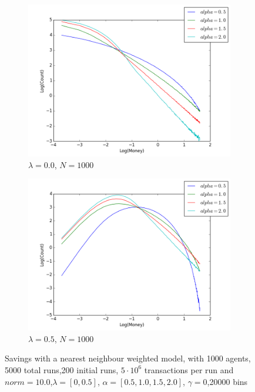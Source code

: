 \documentclass[a4paper,11pt]{article}
\begin{document}
{\begin{figure}[H]
	\centering
	\begin{subfigure}[t]{0.45\textwidth}
		\includegraphics[scale=0.4]{nearestneighbor_lambda=0_0_agens=1000}
		\caption{$\lambda = 0.0$, $N=1000$}
		\label{fig:0.0_1000}
	\end{subfigure}
	\begin{subfigure}[t]{0.45\textwidth}
		\includegraphics[scale=0.4]{nearestneighbor_lambda=0_5_agens=1000}
		\caption{$\lambda = 0.5$, $N=1000$}
		\label{fig:0.5_1000}
	\end{subfigure}
	\caption{Savings with a nearest neighbour weighted  model, with 1000 agents, 5000 total runs,200 initial runs,  $5\cdot 10^{6}$ transactions per run and  $norm=10.0$,$\lambda=[0,0.5]$, $\alpha=[0.5,1.0,1.5,2.0]$, $\gamma=0$,20000 bins}
	\label{fig:alpha_n1000}
\end{figure}


}
\end{document}
